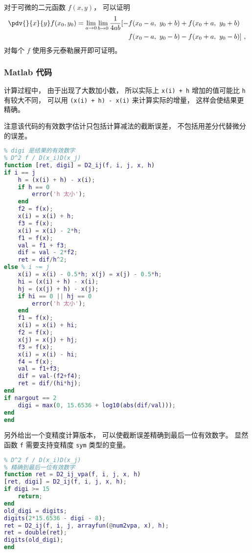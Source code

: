 
\begin{issues}
\issueDraft
\end{issues}


对于可微的二元函数 $f(x,y)$， 可以证明
\begin{equation}
\begin{aligned}
\pdv{}{x}{y} f(x_0,y_0) = \lim_{a\to 0}\lim_{b\to 0}\frac{1}{4ab}[-& f(x_0-a,\ y_0+b) + f(x_0+a,\  y_0+b)\\
& f(x_0-a,\  y_0-b) - f(x_0+a,\  y_0-b)]~,
\end{aligned}
\end{equation}
对每个 $f$ 使用多元泰勒展开即可证明。

\subsubsection{Matlab 代码}

计算过程中， 由于出现了大数加小数， 所以实际上 \verb|x(i) + h| 增加的值可能比 \verb|h| 有较大不同， 可以用 \verb|(x(i) + h) - x(i)| 来计算实际的增量， 这样会使结果更精确。

注意该代码的有效数字估计只包括计算减法的截断误差， 不包括用差分代替微分的误差。
\begin{lstlisting}[language=matlab, caption=D2\_ij.m]
% 数值二阶偏导
% digi 是结果的有效数字
% D^2 f / D(x_i)D(x_j)
function [ret, digi] = D2_ij(f, i, j, x, h)
if i == j
    h = (x(i) + h) - x(i);
    if h == 0
        error('h 太小');
    end
    f2 = f(x);
    x(i) = x(i) + h;
    f3 = f(x);
    x(i) = x(i) - 2*h;
    f1 = f(x);
    val = f1 + f3;
    dif = val - 2*f2;
    ret = dif/h^2;
else % i ~= j
    x(i) = x(i) - 0.5*h; x(j) = x(j) - 0.5*h;
    hi = (x(i) + h) - x(i);
    hj = (x(j) + h) - x(j);
    if hi == 0 || hj == 0
        error('h 太小');
    end
    f1 = f(x);
    x(i) = x(i) + hi;
    f2 = f(x);
    x(j) = x(j) + hj;
    f3 = f(x);
    x(i) = x(i) - hi;
    f4 = f(x);
    val = f1+f3;
    dif = val-(f2+f4);
    ret = dif/(hi*hj);
end
if nargout == 2
    digi = max(0, 15.6536 + log10(abs(dif/val)));
end
end
\end{lstlisting}

另外给出一个变精度计算版本， 可以使截断误差精确到最后一位有效数字。 显然函数 \verb|f| 需要支持变精度 \verb|sym| 类型的变量。
\begin{lstlisting}[language=matlab, caption=D2\_ij\_vpa.m]
% 数值二阶偏导 (变精度)
% D^2 f / D(x_i)D(x_j)
% 精确到最后一位有效数字
function ret = D2_ij_vpa(f, i, j, x, h)
[ret, digi] = D2_ij(f, i, j, x, h);
if digi >= 15
    return;
end
old_digi = digits;
digits(2*15.6536 - digi - 8);
ret = D2_ij(f, i, j, arrayfun(@num2vpa, x), h);
ret = double(ret);
digits(old_digi);
end
\end{lstlisting}
